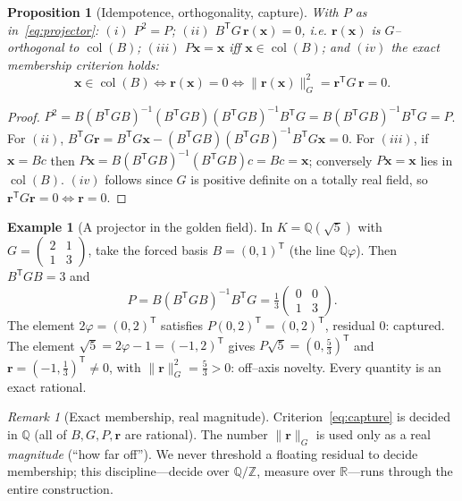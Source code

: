 \documentclass[11pt]{article}
\theoremstyle{plain}
\newtheorem{proposition}[theorem]{Proposition}
\theoremstyle{definition}
\newtheorem{example}[theorem]{Example}
\theoremstyle{remark}
\newtheorem{remark}[theorem]{Remark}
\newcommand{\Q}{\mathbb{Q}}
\newcommand{\Z}{\mathbb{Z}}
\newcommand{\R}{\mathbb{R}}
\newcommand{\K}{K}
\newcommand{\rr}{\mathbf{r}}
\newcommand{\xx}{\mathbf{x}}
\newcommand{\GG}{G}
\newcommand{\BB}{B}
\newcommand{\transpose}{^{\mathsf{T}}}
\newcommand{\inv}{^{-1}}
\DeclareMathOperator{\col}{col}
\begin{document}
\begin{proposition}[Idempotence, orthogonality, capture]\label{prop:proj}
With $P$ as in~\eqref{eq:projector}: $(i)$ $P^2=P$; $(ii)$ $\BB\transpose\GG\,\rr(\xx)=0$, i.e. $\rr(\xx)$ is
$\GG$--orthogonal to $\col(\BB)$; $(iii)$ $P\xx=\xx$ iff $\xx\in\col(\BB)$; and $(iv)$ the exact membership
criterion holds:
\begin{equation}\label{eq:capture}
   \xx\in\col(\BB)\iff \rr(\xx)=0 \iff \lVert\rr(\xx)\rVert_{\GG}^2=\rr\transpose\GG\,\rr=0 .
\end{equation}
\end{proposition}
\begin{proof}
$P^2=\BB(\BB\transpose\GG\BB)\inv(\BB\transpose\GG\BB)(\BB\transpose\GG\BB)\inv\BB\transpose\GG
=\BB(\BB\transpose\GG\BB)\inv\BB\transpose\GG=P$. For $(ii)$, $\BB\transpose\GG\rr
=\BB\transpose\GG\xx-(\BB\transpose\GG\BB)(\BB\transpose\GG\BB)\inv\BB\transpose\GG\xx=0$. For $(iii)$, if
$\xx=\BB c$ then $P\xx=\BB(\BB\transpose\GG\BB)\inv(\BB\transpose\GG\BB)c=\BB c=\xx$; conversely $P\xx=\xx$
lies in $\col(\BB)$. $(iv)$ follows since $\GG$ is positive definite on a totally real field, so
$\rr\transpose\GG\rr=0\Leftrightarrow\rr=0$.
\end{proof}

\begin{example}[A projector in the golden field]\label{ex:proj5}
In $\K=\Q(\sqrt5)$ with $\GG=\left(\begin{smallmatrix}2&1\\1&3\end{smallmatrix}\right)$, take the forced
basis $\BB=(0,1)\transpose$ (the line $\Q\varphi$). Then $\BB\transpose\GG\BB=3$ and
\[
  P=\BB(\BB\transpose\GG\BB)\inv\BB\transpose\GG
   =\tfrac13\begin{pmatrix}0&0\\1&3\end{pmatrix}.
\]
The element $2\varphi=(0,2)\transpose$ satisfies $P(0,2)\transpose=(0,2)\transpose$, residual $0$: captured.
The element $\sqrt5=2\varphi-1=(-1,2)\transpose$ gives $P\sqrt5=(0,\tfrac53)\transpose$ and
$\rr=(-1,\tfrac13)\transpose\neq0$, with $\lVert\rr\rVert_{\GG}^2=\tfrac53>0$: off--axis novelty. Every
quantity is an exact rational.
\end{example}

\begin{remark}[Exact membership, real magnitude]\label{rem:exactfloat}
Criterion~\eqref{eq:capture} is decided in $\Q$ (all of $\BB,\GG,P,\rr$ are rational). The number
$\lVert\rr\rVert_{\GG}$ is used only as a real \emph{magnitude} (``how far off''). We never threshold a
floating residual to decide membership; this discipline---decide over $\Q/\Z$, measure over $\R$---runs
through the entire construction.
\end{remark}
\end{document}
